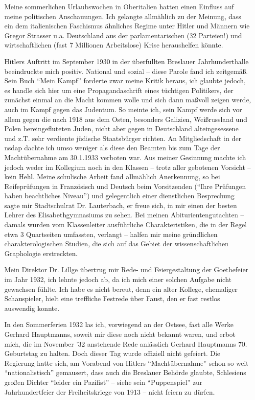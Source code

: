 Meine sommerlichen Urlaubswochen in Oberitalien hatten einen Einfluss auf meine politischen Anschauungen. Ich gelangte allmählich zu der Meinung, dass ein dem italienischen Faschismus ähnliches Regime unter Hitler und Männern wie Gregor Strasser u.a. Deutschland aus der parlamentarischen (32 Parteien!) und wirtschaftlichen (fast 7 Millionen Arbeitslose) Krise heraushelfen könnte.

Hitlers Auftritt im September 1930 in der überfüllten Breslauer Jahrhunderthalle beeindruckte mich positiv. National und sozial -- diese Parole fand ich zeitgemäß. Sein Buch \enquote{Mein Kampf} forderte zwar meine Kritik heraus, ich glaubte jedoch, es handle sich hier um eine Propagandaschrift eines tüchtigen Politikers, der zunächst einmal an die Macht kommen wolle und sich dann maßvoll zeigen werde, auch im Kampf gegen das Judentum. So meinte ich, sein Kampf werde sich vor allem gegen die nach 1918 aus dem Osten, besonders Galizien, Weißrussland und Polen hereingefluteten Juden, nicht aber gegen in Deutschland alteingesessene und z.T. sehr verdiente jüdische Staatsbürger richten. An Mitgliedschaft in der \ac{nsdap} dachte ich umso weniger als diese den Beamten bis zum Tage der Machtübernahme am 30.1.1933 verboten war. Aus meiner Gesinnung machte ich jedoch weder im Kollegium noch in den Klassen -- trotz aller gebotenen Vorsicht -- kein Hehl. Meine schulische Arbeit fand allmählich Anerkennung, so bei Reifeprüfungen in Französisch und Deutsch beim Vorsitzenden (\enquote{Ihre Prüfungen haben beachtliches Niveau}) und gelegentlich einer dienstlichen Besprechung sagte mir Stadtschulrat Dr. Lauterbach, er freue sich, in mir einen der besten Lehrer des Elisabethgymnasiums zu sehen. Bei meinen Abiturientengutachten -- damals wurden vom Klassenleiter ausführliche Charakteristiken, die in der Regel etwa 3 Quartseiten umfassten, verlangt -- halfen mir meine gründlichen charakterologischen Studien, die sich auf das Gebiet der wissenschaftlichen Graphologie erstreckten.

Mein Direktor Dr. Lillge übertrug mir Rede- und Feiergestaltung der Goethefeier im Jahr 1932, ich lehnte jedoch ab, da ich mich einer solchen Aufgabe nicht gewachsen fühlte. Ich habe es nicht bereut, denn ein alter Kollege, ehemaliger Schauspieler, hielt eine treffliche Festrede über Faust, den er fast restlos auswendig konnte.

In den Sommerferien 1932 las ich, vorwiegend an der Ostsee, fast alle Werke Gerhard Hauptmanns, soweit mir diese noch nicht bekannt waren, und erbot mich, die im November '32 anstehende Rede anlässlich Gerhard Hauptmanns 70. Geburtstag zu halten. Doch dieser Tag wurde offiziell nicht gefeiert. Die Regierung hatte sich, am Vorabend von Hitlers \enquote{Machtübernahme} schon so weit \enquote{nationalistisch} gemausert, dass auch die Breslauer Behörde glaubte, Schlesiens großen Dichter \enquote{leider ein Pazifist} -- siehe sein \enquote{Puppenspiel} zur Jahrhundertfeier der Freiheitskriege von 1913 -- nicht feiern zu dürfen.

